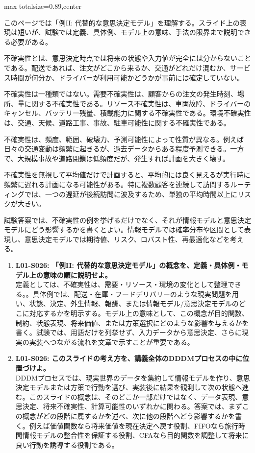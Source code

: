 \begin{minipage}[t]{0.58\textwidth}
\begin{adjustbox}{max totalsize={\textwidth}{0.89\textheight},center}
\begin{minipage}{\textwidth}\scriptsize
{}このページでは「例II: 代替的な意思決定モデル」を理解する。スライド上の表現は短いが、試験では定義、具体例、モデル上の意味、手法の限界まで説明できる必要がある。\par
不確実性とは、意思決定時点では将来の状態や入力値が完全には分からないことである。配送であれば、注文がどこから来るか、交通がどれだけ混むか、サービス時間が何分か、ドライバーが利用可能かどうかが事前には確定していない。\par
不確実性は一種類ではない。需要不確実性は、顧客からの注文の発生時刻、場所、量に関する不確実性である。リソース不確実性は、車両故障、ドライバーのキャンセル、バッテリー残量、積載能力に関する不確実性である。環境不確実性は、交通、天候、道路工事、事故、駐車可能性に関する不確実性である。\par
不確実性は、頻度、範囲、破壊力、予測可能性によって性質が異なる。例えば日々の交通変動は頻繁に起きるが、過去データからある程度予測できる。一方で、大規模事故や道路閉鎖は低頻度だが、発生すれば計画を大きく壊す。\par
不確実性を無視して平均値だけで計画すると、平均的には良く見えるが実行時に頻繁に遅れる計画になる可能性がある。特に複数顧客を連続して訪問するルーティングでは、一つの遅延が後続訪問に波及するため、単独の平均時間以上にリスクが大きい。\par
試験答案では、不確実性の例を挙げるだけでなく、それが情報モデルと意思決定モデルにどう影響するかを書くとよい。情報モデルでは確率分布や区間として表現し、意思決定モデルでは期待値、リスク、ロバスト性、再最適化などを考える。\par{}\begin{enumerate}\item \textbf{L01-S026: 「例II: 代替的な意思決定モデル」の概念を、定義・具体例・モデル上の意味の順に説明せよ。}\\定義としては、不確実性は、需要・リソース・環境の変化として整理できる。。具体例では、配送・在庫・フードデリバリーのような現実問題を用い、状態、決定、外生情報、報酬、または情報モデル/意思決定モデルのどこに対応するかを明示する。モデル上の意味として、この概念が目的関数、制約、状態表現、将来価値、または方策選択にどのような影響を与えるかを書く。試験では、用語だけを列挙せず、入力データから意思決定、さらに現実の実装へつながる流れを文章で示すことが重要である。\item \textbf{L01-S026: このスライドの考え方を、講義全体のDDDMプロセスの中に位置づけよ。}\\DDDMプロセスでは、現実世界のデータを集約して情報モデルを作り、意思決定モデルまたは方策で行動を選び、実装後に結果を観測して次の状態へ進む。このスライドの概念は、そのどこか一部だけではなく、データ表現、意思決定、将来不確実性、計算可能性のいずれかに関わる。答案では、まずこの概念がどの段階に属するかを述べ、次に他の段階へどう影響するかを書く。例えば価値関数なら将来価値を現在決定へ戻す役割、FIFOなら旅行時間情報モデルの整合性を保証する役割、CFAなら目的関数を調整して将来に良い行動を誘導する役割である。\end{enumerate}

\end{minipage}
\end{adjustbox}
\end{minipage}
